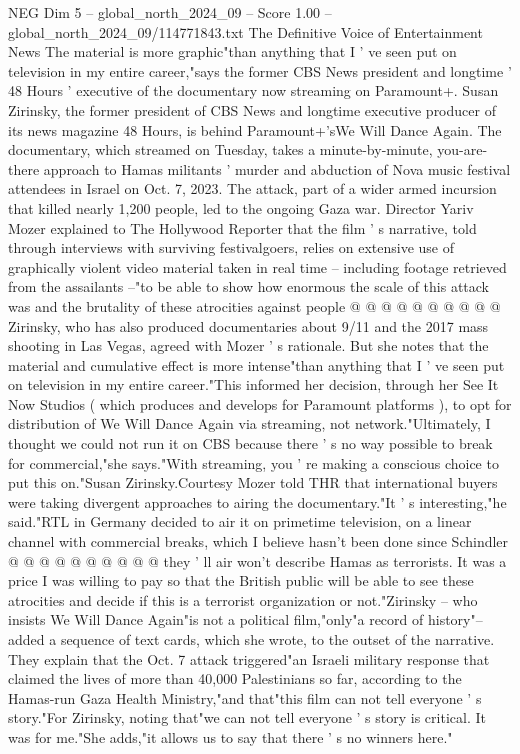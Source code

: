 \begin{textsample}{NEG Dim 5 – global\_north\_2024\_09 – Score 1.00 – global\_north\_2024\_09/114771843.txt}  \label{ex:f5_neg_098}
The Definitive Voice of Entertainment News The material is more graphic"than anything that I ' ve seen put on television in my entire career,"says the former CBS News president and longtime ' 48 Hours ' executive of the documentary now streaming on Paramount+.
Susan Zirinsky, the former president of CBS News and longtime executive producer of its news magazine 48 Hours, is behind Paramount+'sWe Will Dance Again.
The documentary, which streamed on Tuesday, takes a minute-by-minute, you-are-there approach to Hamas militants ' murder and abduction of Nova music festival attendees in Israel on Oct. 7, 2023.
The attack, part of a wider armed incursion that killed nearly 1,200 people, led to the ongoing Gaza war.
Director Yariv Mozer explained to The Hollywood Reporter that the film ' s narrative, told through interviews with surviving festivalgoers, relies on extensive use of graphically violent video material taken in real time -- including footage retrieved from the assailants --"to be able to show how enormous the scale of this attack was and the brutality of these atrocities against people @ @ @ @ @ @ @ @ @ @ Zirinsky, who has also produced documentaries about 9/11 and the 2017 mass shooting in Las Vegas, agreed with Mozer ' s rationale.
But she notes that the material and cumulative effect is more intense"than anything that I ' ve seen put on television in my entire career."This informed her decision, through her See It Now Studios ( which produces and develops for Paramount platforms ), to opt for distribution of We Will Dance Again via streaming, not network."Ultimately, I thought we could not run it on CBS because there ' s no way possible to break for commercial,"she says."With streaming, you ' re making a conscious choice to put this on."Susan Zirinsky.Courtesy Mozer told THR that international buyers were taking divergent approaches to airing the documentary."It ' s interesting,"he said."RTL in Germany decided to air it on primetime television, on a linear channel with commercial breaks, which I believe hasn't been done since Schindler @ @ @ @ @ @ @ @ @ @ they ' ll air won't describe Hamas as terrorists.
It was a price I was willing to pay so that the British public will be able to see these atrocities and decide if this is a terrorist organization or not."Zirinsky -- who insists We Will Dance Again"is not a political film,"only"a record of history"-- added a sequence of text cards, which she wrote, to the outset of the narrative.
They explain that the Oct. 7 attack triggered"an Israeli military response that claimed the lives of more than 40,000 Palestinians so far, according to the Hamas-run Gaza Health Ministry,"and that"this film can not tell everyone ' s story."For Zirinsky, noting that"we can not tell everyone ' s story is critical.
It was for me."She adds,"it allows us to say that there ' s no winners here."

\end{textsample}
